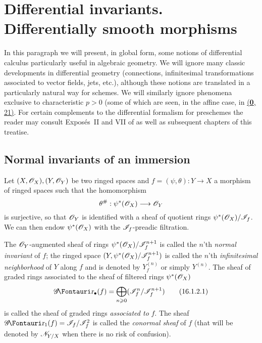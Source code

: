 \setcounter{section}{15}
\section{Differential invariants. Differentially smooth morphisms}
\label{section:IV.16}

In this paragraph we will present, in global form, some notions of differential calculus particularly useful in algebraic geometry.
We will ignore many classic developments in differential geometry (connections, infinitesimal transformations associated to vector fields, jets, etc.), although these notions are translated in a particularly natural way for schemes.
We will similarly ignore phenomena exclusive to characteristic $p>0$ (some of which are seen, in the affine case, in \hyperref[section:0.21]{(\textbf{0}, 21)}.
For certain complements to the differential formalism for preschemes the reader may consult Expos\'es~II and VII of \cite{IV-42} as well as subsequent chapters of this treatise. 

\subsection{Normal invariants of an immersion}
\label{IV.16.1}

\begin{env}[16.1.1]
\label{IV.16.1.1}

Let $(X, \mathscr{O}_X), (Y, \mathscr{O}_Y)$ be two ringed spaces and $f = (\psi, \theta): Y \to X$ a morphism of ringed spaces  such that the homomorphism
\[
  \theta^\#: \psi^*(\sh{O}_X) \to \sh{O}_Y
\]
is surjective, so that $\mathscr{O}_Y$ is identified with a sheaf of quotient rings $\psi^*(\mathscr{O}_X)/\mathscr{I}_f$. 
We can then endow $\psi^*(\mathscr{O}_X)$ with the $\mathscr{I}_f$-preadic filtration.
\end{env}

\begin{definition}[16.1.2]
\label{IV.16.1.2}
The $\mathscr{O}_Y$-augmented sheaf of rings $\psi^*(\mathscr{O}_X)/\mathscr{I}_f^{n+1}$ is called the $n$'th \emph{normal invariant} of $f$;
the ringed space $(Y, \psi^*(\mathscr{O}_X)/\mathscr{I}_f^{n+1})$ is called the $n$'th \emph{infinitesimal neighborhood} of $Y$ along $f$ and is denoted by $Y^{(n)}_f$ or simply $Y^{(n)}$.
The sheaf of graded rings associated to the sheaf of filtered rings $\psi^*(\mathscr{O}_X)$
\[
  \label{IV.16.1.2.1}
  \shGr_\bullet(f) = \bigoplus_{n \geq 0}(\sh{I}_f^{n}/\sh{I}_f^{n+1} )
  \tag{16.1.2.1}
\]
is called the sheaf of graded rings \emph{associated to} $f$. The sheaf $\shGr_1(f) = \sh{I}_f/\sh{I}_f^{2}$ is called the \emph{conormal sheaf} of $f$ (that will be denoted by $\mathscr{N}_{Y/X}$ when there is no risk of confusion). 
\end{definition}


